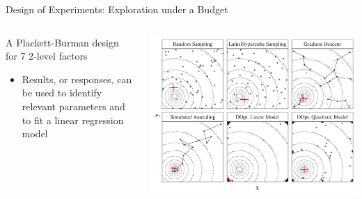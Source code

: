 \documentclass[11pt, compress, aspectratio=169, xcolor={table,usenames,dvipsnames}]{beamer}
\begin{document}
\begin{frame}
\begin{columns}
\begin{column}{0.86\columnwidth}
\begin{columns}
\begin{column}[t]{0.5\columnwidth}
\begin{block}{Design of Experiments: Exploration under a Budget}
\vspace{1em}
\begin{columns}
\begin{column}{0.39\columnwidth}
{\scriptsize

}
\begin{center}
{\tiny
A \alert{Plackett-Burman} design \\[-0.5em] for \alert{7 2-level factors}
}
\end{center}
\vspace{0.2em}
\begin{itemize}
\item \alert{Results}, or \alert{responses}, can be used to
identify \alert{relevant parameters} and to \alert{fit a linear regression
model}
\end{itemize}
\end{column}
\begin{column}{0.59\columnwidth}
\begin{center}
\begin{center}
\includegraphics[width=0.98\columnwidth]{../../../img/sampling_comparison.pdf}
\end{center}
\end{center}


\end{column}
\end{columns}
\end{block}
\end{column}
\end{columns}
\end{column}
\end{columns}
\end{frame}
\end{document}
